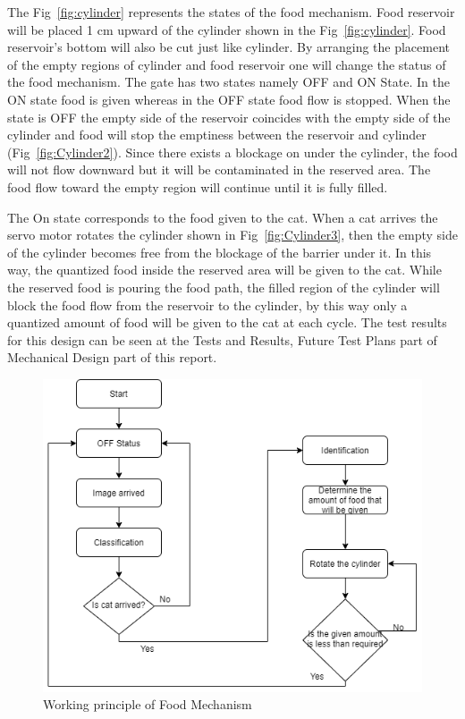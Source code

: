 The Fig~\ref{fig:cylinder} represents the states of the food mechanism. Food reservoir will be placed 1 cm upward of the cylinder shown in the Fig~\ref{fig:cylinder}. Food reservoir's bottom will also be cut just like cylinder. By arranging the placement of the empty regions of cylinder and food reservoir one will change the status of the food mechanism.
The gate has two states namely OFF and ON State. In the ON state food is given whereas in the OFF state food flow is stopped. When the state is OFF the empty side of the reservoir coincides with the empty side of the cylinder and food will stop the emptiness between the reservoir and cylinder (Fig~\ref{fig:Cylinder2}). Since there exists a blockage on under the cylinder, the food will not flow downward but it will be contaminated in the reserved area. The food flow toward the empty region will continue until it is fully filled. 

The On state corresponds to the food given to the cat. When a cat arrives the servo motor rotates the cylinder shown in Fig~\ref{fig:Cylinder3}, then the empty side of the cylinder becomes free from the blockage of the barrier under it. In this way, the quantized food inside the reserved area will be given to the cat. While the reserved food is pouring the food path, the filled region of the cylinder will block the food flow from the reservoir to the cylinder, by this way only a quantized amount of food will be given to the cat at each cycle. The test results for this design can be seen at the Tests and Results, Future Test Plans part of Mechanical Design part of this report.

\begin{figure}[ht]
     \centering
     \includegraphics[width=0.8\linewidth]{content/060_mechanical_design/FoodFlowChart.png}
     \caption{Working principle of Food Mechanism}
     \label{fig:Food Flow Mechanism}
\end{figure}

